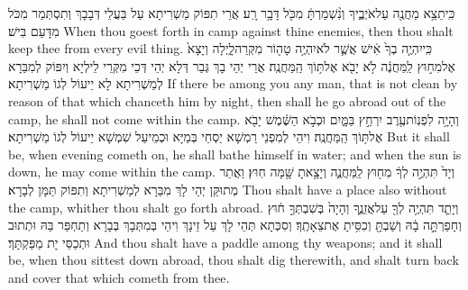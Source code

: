 {כִּֽי\maqqaf תֵצֵ֥א מַחֲנֶ֖ה עַל\maqqaf אֹיְבֶ֑יךָ וְנִ֨שְׁמַרְתָּ֔ מִכֹּ֖ל דָּבָ֥ר רָֽע׃}
{אֲרֵי תִפּוֹק מַשְׁרִיתָא עַל בַּעֲלֵי דְּבָבָךְ וְתִסְתְּמַר מִכֹּל מִדָּעַם בִּישׁ׃}
{When thou goest forth in camp against thine enemies, then thou shalt keep thee from every evil thing.}{}
{כִּֽי\maqqaf יִהְיֶ֤ה בְךָ֙ אִ֔ישׁ אֲשֶׁ֛ר לֹא\maqqaf יִהְיֶ֥ה טָה֖וֹר מִקְּרֵה\maqqaf לָ֑יְלָה וְיָצָא֙ אֶל\maqqaf מִח֣וּץ לַֽמַּחֲנֶ֔ה לֹ֥א יָבֹ֖א אֶל\maqqaf תּ֥וֹךְ הַֽמַּחֲנֶֽה׃}
{אֲרֵי יְהֵי בָךְ גְּבַר דְּלָא יְהֵי דְּכֵי מִקְּרֵי לֵילְיָא וְיִפּוֹק לְמִבַּרָא לְמַשְׁרִיתָא לָא יֵיעוֹל לְגוֹ מַשְׁרִיתָא׃}
{If there be among you any man, that is not clean by reason of that which chanceth him by night, then shall he go abroad out of the camp, he shall not come within the camp.}{}
{וְהָיָ֥ה לִפְנֽוֹת\maqqaf עֶ֖רֶב יִרְחַ֣ץ בַּמָּ֑יִם וּכְבֹ֣א הַשֶּׁ֔מֶשׁ יָבֹ֖א אֶל\maqqaf תּ֥וֹךְ הַֽמַּחֲנֶֽה׃}
{וִיהֵי לְמִפְנֵי רַמְשָׁא יַסְחֵי בְּמַיָּא וּכְמֵיעַל שִׁמְשָׁא יֵיעוֹל לְגוֹ מַשְׁרִיתָא׃}
{But it shall be, when evening cometh on, he shall bathe himself in water; and when the sun is down, he may come within the camp.}{}
{וְיָד֙ תִּהְיֶ֣ה לְךָ֔ מִח֖וּץ לַֽמַּחֲנֶ֑ה וְיָצָ֥אתָ שָּׁ֖מָּה חֽוּץ׃}
{וַאֲתַר מְתוּקַּן יְהֵי לָךְ מִבַּרָא לְמַשְׁרִיתָא וְתִפּוֹק תַּמָּן לְבָרָא׃}
{Thou shalt have a place also without the camp, whither thou shalt go forth abroad.}{}
{וְיָתֵ֛ד תִּהְיֶ֥ה לְךָ֖ עַל\maqqaf אֲזֵנֶ֑ךָ וְהָיָה֙ בְּשִׁבְתְּךָ֣ ח֔וּץ וְחָפַרְתָּ֣ה בָ֔הּ וְשַׁבְתָּ֖ וְכִסִּ֥יתָ אֶת\maqqaf צֵאָתֶֽךָ׃}
{וְסִכְּתָא תְּהֵי לָךְ עַל זֵינָךְ וִיהֵי בְּמִתְּבָךְ בְּבָרָא וְתַחְפַּר בַּהּ וּתְתוּב וּתְכַסֵּי יָת מַפַּקְתָּךְ׃}
{And thou shalt have a paddle among thy weapons; and it shall be, when thou sittest down abroad, thou shalt dig therewith, and shalt turn back and cover that which cometh from thee.}{}
